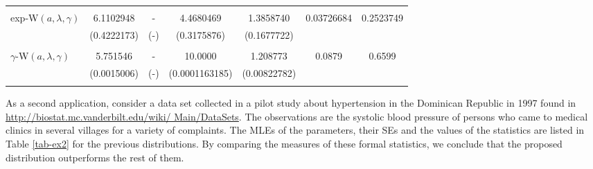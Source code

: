 \documentclass[twoside,leqno,11pt]{article}
\begin{document}
\begin{table}[!htb]
\begin{tabular}{lcccccc}
 & & & & &  \\
exp-W$(a,\lambda,\gamma)$   &    6.1102948   & - &   4.4680469 &  1.3858740 &   0.03726684   & 0.2523749 \\
&   (0.4222173) & (-) & (0.3175876) & (0.1677722)   &  & \\

 & & & & &  \\
$\gamma$-W$(a,\lambda,\gamma)$    & 5.751546  & - &  10.0000 & 1.208773&  0.0879 & 0.6599  \\
&  (0.0015006)&  (-)&  (0.0001163185) &(0.00822782)    &  & \\

 & & & & &  \\





                                                     \hline
\end{tabular}
\end{table}



As a second application, consider a data set collected in a pilot study about hypertension in the Dominican Republic
in 1997 found in \url{http://biostat.mc.vanderbilt.edu/wiki/
Main/DataSets}. The observations are the systolic blood pressure of persons who came to medical clinics in
several villages for a variety of complaints. The MLEs of the parameters, their SEs and the values of the statistics are
listed in Table \ref{tab-ex2} for the previous distributions. By comparing the measures of these formal statistics,
we conclude that the proposed distribution outperforms the rest of them.
\end{document}
